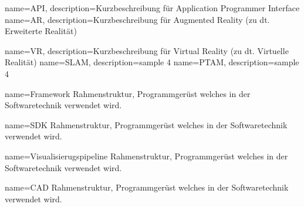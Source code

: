 {
	name={API},
	description={Kurzbeschreibung für Application Programmer Interface}
}
{
	name={AR},
	description={Kurzbeschreibung für Augmented Reality (zu dt. Erweiterte Realität)}
}

{
	name={VR},
	description={Kurzbeschreibung für Virtual Reality (zu dt. Virtuelle Realität)}
}
{
	name={SLAM},
	description={sample 4}
}
{
	name={PTAM},
	description={sample 4}
}



{
	name=Framework
}
{Rahmenstruktur, Programmgerüst welches in der Softwaretechnik verwendet wird.}

{
	name=SDK
}
{Rahmenstruktur, Programmgerüst welches in der Softwaretechnik verwendet wird.}

{
	name=Visualisierugspipeline
}
{Rahmenstruktur, Programmgerüst welches in der Softwaretechnik verwendet wird.}

{
	name=CAD
}
{Rahmenstruktur, Programmgerüst welches in der Softwaretechnik verwendet wird.}